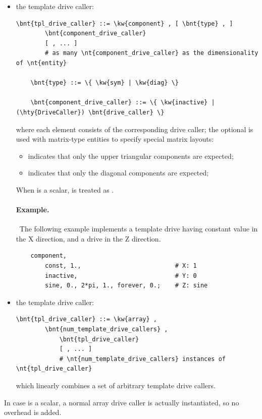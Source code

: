 \begin{itemize}
\item the  template drive caller:
\begin{Verbatim}[commandchars=\\\{\}]
    \bnt{tpl_drive_caller} ::= \kw{component} , [ \bnt{type} , ]
        \bnt{component_drive_caller}
        [ , ... ]
        # as many \nt{component_drive_caller} as the dimensionality of \nt{entity}

    \bnt{type} ::= \{ \kw{sym} | \kw{diag} \}

    \bnt{component_drive_caller} ::= \{ \kw{inactive} | (\hty{DriveCaller}) \bnt{drive_caller} \}
\end{Verbatim}
where each element consists of the corresponding drive caller;
the optional  is used with matrix-type entities to specify
special matrix layouts:
\begin{itemize}
\item {} indicates that only the upper triangular components are expected;
\item {} indicates that only the diagonal components are expected;
\end{itemize}
When  is a scalar,  is treated as .

\paragraph{Example.} \
The following example implements a  template drive having constant value in the X direction, and a  drive in the Z direction.
\begin{verbatim}
    component,
        const, 1.,                          # X: 1
        inactive,                           # Y: 0
        sine, 0., 2*pi, 1., forever, 0.;    # Z: sine
\end{verbatim}

\item the  template drive caller:
\begin{Verbatim}[commandchars=\\\{\}]
    \bnt{tpl_drive_caller} ::= \kw{array} ,
        \bnt{num_template_drive_callers} ,
            \bnt{tpl_drive_caller}
            [ , ... ]
            # \nt{num_template_drive_callers} instances of \nt{tpl_drive_caller}
\end{Verbatim}
which linearly combines a set of arbitrary template drive callers.
\end{itemize}
In case  is a scalar, a normal array drive caller is actually instantiated,
so no overhead is added.

